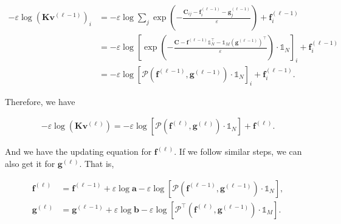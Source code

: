 \begin{equation*}
  \begin{aligned}
    -\varepsilon\log \left(\mathbf{K} \mathbf{v}^{(\ell-1)}\right)_i
     & =
    -\varepsilon\log \sum_j \exp(- \frac{\mathbf{C}_{ij} - \mathbf{f}_i^{(\ell-1)} - \mathbf{g}_j^{(\ell-1)}}{\varepsilon})
    + \mathbf{f}_i^{(\ell-1)} \\
     & =
    -\varepsilon\log \left[
      \exp \left(
      -\frac{\mathbf{C} - \mathbf{f}^{(\ell-1)} \mathbb{1}_N^\top - \mathbb{1}_M (\mathbf{g}^{(\ell-1)})^\top}{\varepsilon}
      \right)
      \cdot \mathbb{1}_N
      \right]_i
    + \mathbf{f}_i^{(\ell-1)} \\
     & =
    -\varepsilon\log
    \left[
      \mathcal{P} \left(\mathbf{f}^{(\ell-1)}, \mathbf{g}^{(\ell-1)}\right)\cdot \mathbb{1}_N
      \right]_i + \mathbf{f}_i^{(\ell-1)}.
  \end{aligned}
\end{equation*}

Therefore, we have

\begin{equation}\label{eqn:neg-log-kv-vec}
  \begin{aligned}
    - \varepsilon \log \left(\mathbf{K} \mathbf{v}^{(\ell)}\right)
    = - \varepsilon \log \left[
      \mathcal{P} \left(\mathbf{f}^{(\ell)}, \mathbf{g}^{(\ell)}\right)\cdot \mathbb{1}_N
      \right] + \mathbf{f}^{(\ell)}.
  \end{aligned}
\end{equation}

And we have the updating equation for $\mathbf{f}^{(\ell)}$.
If we follow similar steps, we can also get it for $\mathbf{g}^{(\ell)}$.
That is,

\begin{equation}\label{eqn:update-fg-by-P}
  \begin{aligned}
    \mathbf{f}^{(\ell)}
     & = \mathbf{f}^{(\ell-1)} + \varepsilon\log \mathbf{a} -\varepsilon\log
    \left[
      \mathcal{P} \left(\mathbf{f}^{(\ell-1)}, \mathbf{g}^{(\ell-1)}\right)\cdot \mathbb{1}_N
    \right],                                                                 \\
    \mathbf{g}^{(\ell)}
     & = \mathbf{g}^{(\ell-1)} + \varepsilon\log \mathbf{b} -\varepsilon\log
    \left[
      \mathcal{P}^\top \left(\mathbf{f}^{(\ell)}, \mathbf{g}^{(\ell-1)}\right) \cdot \mathbb{1}_M
      \right].
  \end{aligned}
\end{equation}


